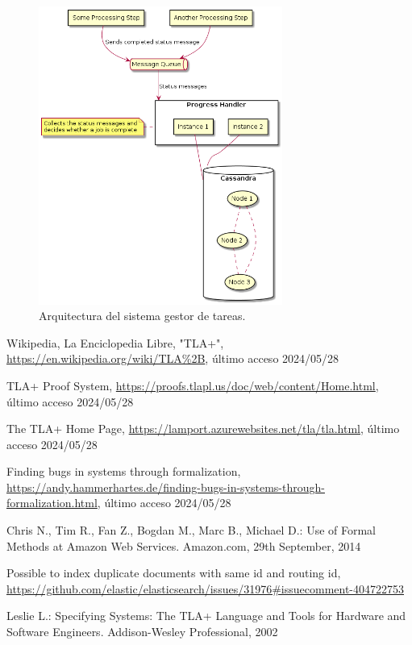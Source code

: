 \documentclass[runningheads]{llncs}
\begin{document}
\begin{figure}[t]
    \caption{Arquitectura del sistema gestor de tareas.}\label{sistema}
    \includegraphics[width=8cm]{formalizing-the-system.png}
    \centering
\end{figure}


\begin{thebibliography}{8}
Wikipedia, La Enciclopedia Libre, "TLA+", \url{https://en.wikipedia.org/wiki/TLA%2B}, último acceso 2024/05/28

TLA+ Proof System, \url{https://proofs.tlapl.us/doc/web/content/Home.html}, último acceso 2024/05/28

The TLA+ Home Page, \url{https://lamport.azurewebsites.net/tla/tla.html}, último acceso 2024/05/28

Finding bugs in systems through formalization, \url{https://andy.hammerhartes.de/finding-bugs-in-systems-through-formalization.html}, último acceso 2024/05/28

Chris N., Tim R., Fan Z., Bogdan M., Marc B., Michael D.: Use of Formal Methods at Amazon Web Services. Amazon.com, 29th September, 2014

Possible to index duplicate documents with same id and routing id, \url{https://github.com/elastic/elasticsearch/issues/31976#issuecomment-404722753}

Leslie L.: Specifying Systems: The TLA+ Language and Tools for Hardware and Software Engineers. Addison-Wesley Professional, 2002

\end{thebibliography}
\end{document}
